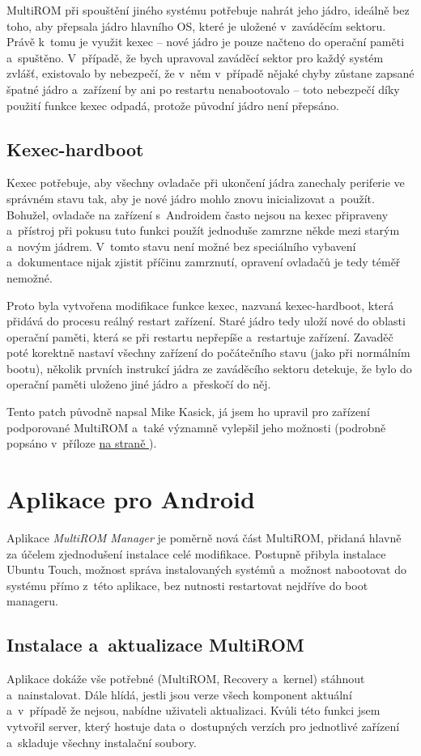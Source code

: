 \documentclass[12pt, a4paper, oneside]{article}
\newcommand{\It}{\textit}  %
\newcommand*{\attref}[1]{\hyperref[{#1}]{\uv{\nameref*{#1}} na straně \pageref{#1}}}
\begin{document}
MultiROM při spouštění jiného systému potřebuje nahrát jeho jádro, ideálně bez toho, aby přepsala jádro hlavního OS, které je uložené v~zaváděcím sektoru. Právě k~tomu je využit kexec -- nové jádro je pouze načteno do operační paměti a~spuštěno. V~případě, že bych upravoval zaváděcí sektor pro každý systém zvlášť, existovalo by nebezpečí, že v~něm v~případě nějaké chyby zůstane zapsané špatné jádro a~zařízení by ani po restartu nenabootovalo -- toto nebezpečí díky použití funkce kexec odpadá, protože původní jádro není přepsáno.

\subsection{Kexec-hardboot}
Kexec potřebuje, aby všechny ovladače při ukončení jádra zanechaly periferie ve správném stavu tak, aby je nové jádro mohlo znovu inicializovat a~použít. Bohužel, ovladače na zařízení s~Androidem často nejsou na kexec připraveny a~přístroj při pokusu tuto funkci použít jednoduše zamrzne někde mezi starým a~novým jádrem. V~tomto stavu není možné bez speciálního vybavení a~dokumentace nijak zjistit příčinu zamrznutí, opravení ovladačů je tedy téměř nemožné.

Proto byla vytvořena modifikace funkce kexec, nazvaná kexec-hardboot, která přidává do procesu reálný restart zařízení. Staré jádro tedy uloží nové do oblasti operační paměti, která se při restartu nepřepíše a~restartuje zařízení. Zavaděč poté korektně nastaví všechny zařízení do počátečního stavu (jako při normálním bootu), několik prvních instrukcí jádra ze zaváděcího sektoru detekuje, že bylo do operační paměti uloženo jiné jádro a~přeskočí do něj.

Tento patch původně napsal Mike Kasick\cite{kexec-hardboot-orig}, já jsem ho upravil pro zařízení podporované MultiROM a~také významně vylepšil jeho možnosti (podrobně popsáno v~příloze \attref{sec:kexec-hardboot}).

\section{Aplikace pro Android}
Aplikace \It{MultiROM Manager} je poměrně nová část MultiROM, přidaná hlavně za účelem zjednodušení instalace celé modifikace. Postupně přibyla instalace Ubuntu Touch, možnost správa instalovaných systémů a~možnost nabootovat do systému přímo z~této aplikace, bez nutnosti restartovat nejdříve do boot manageru.

\subsection{Instalace a~aktualizace MultiROM}
Aplikace dokáže vše potřebné (MultiROM, Recovery a~kernel) stáhnout a~nainstalovat. Dále hlídá, jestli jsou verze všech komponent aktuální a~v~případě že nejsou, nabídne uživateli aktualizaci. Kvůli této funkci jsem vytvořil server, který hostuje data o~dostupných verzích pro jednotlivé zařízení a~skladuje všechny instalační soubory.
\end{document}
